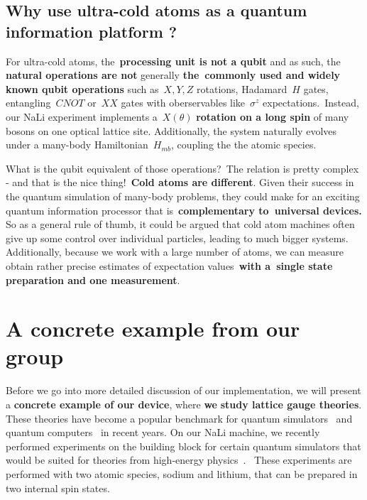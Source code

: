 \documentclass[%
 reprint,
 amsmath,amssymb,
 aps,
]{revtex4-1}
\begin{document}
\subsection*{Why use ultra-cold atoms as a quantum information platform
?}

{\label{677154}}

For ultra-cold atoms, the~\textbf{processing unit is not a qubit} and as
such, the \textbf{natural operations are not} generally
\textbf{the~commonly used and widely known qubit operations} such
as~\(X,Y,Z\) rotations, Hadamard~\(H\) gates,
entangling~\(CNOT \) or~\(XX\) gates with
oberservables like~\(\sigma^z\) expectations.~{{Instead, our NaLi
experiment implements a~}}\(X(\theta)\){ \textbf{rotation on a long
spin} of many bosons on one optical lattice site. Additionally, the
system naturally evolves under a many-body
Hamiltonian~}\(H_{mb}\), coupling the the atomic species.

What is the qubit equivalent of those operations?~{The relation is
pretty complex -} and that is the nice thing!~\textbf{Cold atoms are
different}. Given their success in the quantum simulation of many-body
problems, they could make for an exciting quantum information processor
that is~\textbf{complementary to~}{\textbf{universal devices.}} So as a
general rule of thumb, it could be argued that cold atom machines often
give up some control over individual particles, leading to much bigger
systems. Additionally, because we work with a large number of atoms, we
can measure obtain rather precise estimates of expectation
values~\textbf{{{with a~single state preparation and one
measurement}}}.~

\par\null

\section*{A concrete example from our
group}

{\label{216843}}

Before we go into more detailed discussion of our implementation, we
will present a \textbf{concrete example of our device}, where
\textbf{we} \textbf{study lattice gauge theories}. These theories have
become a popular benchmark for quantum simulators~\cite{Kokail_2019} and
quantum computers~\cite{Martinez_2016,tavernelli2020} in recent years. On our NaLi
machine, we recently performed experiments on the building block for
certain quantum simulators that would be suited for theories from
high-energy physics~\cite{Mil2020}. ~These experiments are performed
with two atomic species, sodium and lithium, that can be prepared in two
internal spin states.~
\end{document}
